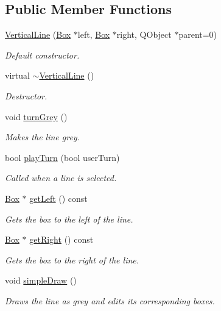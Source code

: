 \subsection*{\-Public \-Member \-Functions}
\begin{DoxyCompactItemize}
\item 
\hyperlink{classVerticalLine_a53b358b7ed8d9bbbaf7ee8b75e9a8665}{\-Vertical\-Line} (\hyperlink{classBox}{\-Box} $\ast$left, \hyperlink{classBox}{\-Box} $\ast$right, \-Q\-Object $\ast$parent=0)
\begin{DoxyCompactList}\small\item\em \-Default constructor. \end{DoxyCompactList}\item 
virtual \hyperlink{classVerticalLine_a925318f98ded156abcde65ccf60830d6}{$\sim$\-Vertical\-Line} ()
\begin{DoxyCompactList}\small\item\em \-Destructor. \end{DoxyCompactList}\item 
void \hyperlink{classVerticalLine_ae4ac7f318bec7b2ed7a90c1c31a3752d}{turn\-Grey} ()
\begin{DoxyCompactList}\small\item\em \-Makes the line grey. \end{DoxyCompactList}\item 
bool \hyperlink{classVerticalLine_ac90ef61324404c12668c73dc5567dc11}{play\-Turn} (bool user\-Turn)
\begin{DoxyCompactList}\small\item\em \-Called when a line is selected. \end{DoxyCompactList}\item 
\hyperlink{classBox}{\-Box} $\ast$ \hyperlink{classVerticalLine_a51e7a4f8a9f201ff3d4215373c1f9909}{get\-Left} () const 
\begin{DoxyCompactList}\small\item\em \-Gets the box to the left of the line. \end{DoxyCompactList}\item 
\hyperlink{classBox}{\-Box} $\ast$ \hyperlink{classVerticalLine_a6a7688ae8c09aca10a841874d8e835ea}{get\-Right} () const 
\begin{DoxyCompactList}\small\item\em \-Gets the box to the right of the line. \end{DoxyCompactList}\item 
\hypertarget{classVerticalLine_a879e9357c8925992e5cb84b28c940200}{void \hyperlink{classVerticalLine_a879e9357c8925992e5cb84b28c940200}{simple\-Draw} ()}\label{classVerticalLine_a879e9357c8925992e5cb84b28c940200}

\begin{DoxyCompactList}\small\item\em \-Draws the line as grey and edits its corresponding boxes. \end{DoxyCompactList}\end{DoxyCompactItemize}


